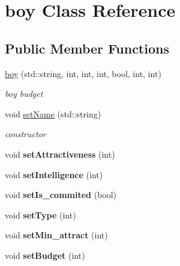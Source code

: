 \hypertarget{classboy}{}\section{boy Class Reference}
\label{classboy}
\subsection*{Public Member Functions}
\begin{DoxyCompactItemize}
\item 
\hyperlink{classboy_aeda8572de2e02a1707c2ca5cf1e5fadb}{boy} (std\+::string, int, int, int, bool, int, int)
\begin{DoxyCompactList}\small\item\em boy budget \end{DoxyCompactList}\item 
\mbox{\label{classboy_a5d2297ec625c9ea85cac3987255380fc}} 
void \hyperlink{classboy_a5d2297ec625c9ea85cac3987255380fc}{set\+Name} (std\+::string)
\begin{DoxyCompactList}\small\item\em constructor \end{DoxyCompactList}\item 
\mbox{\label{classboy_a97f0db302fe7af4f96865b7cf101e882}} 
void {\bfseries set\+Attractiveness} (int)
\item 
\mbox{\label{classboy_ac30638dc34282b9e3c2184c17c3747a4}} 
void {\bfseries set\+Intelligence} (int)
\item 
\mbox{\label{classboy_a4b3da7e37c55db15f496e8f3bb1d3a2b}} 
void {\bfseries set\+Is\+\_\+commited} (bool)
\item 
\mbox{\label{classboy_a7e7af130f5dae098e9cc5b7f20cb5e0d}} 
void {\bfseries set\+Type} (int)
\item 
\mbox{\label{classboy_a9969c10ff3d9cbf1318b638aa5746c89}} 
void {\bfseries set\+Min\+\_\+attract} (int)
\item 
\mbox{\label{classboy_aaf145f49ec525b3a66a9803ce8cf07c4}} 
void {\bfseries set\+Budget} (int)
\item 
\mbox{\label{classboy_a670dc0382568e874db1b457e922c4410}} 

\end{DoxyCompactItemize}
